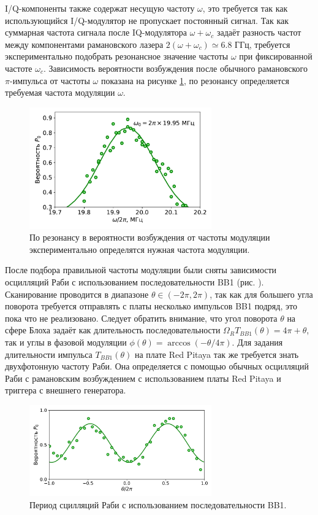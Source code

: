 I/Q-компоненты также содержат несущую частоту $\omega$, это требуется так как использующийся I/Q-модулятор не пропускает постоянный сигнал. Так как суммарная частота сигнала после IQ-модулятора $\omega + \omega_c$ задаёт разность частот между компонентами рамановского лазера $2(\omega + \omega_c) \simeq 6.8 \text{ ГГц}$, требуется экспериментально подобрать резонансное значение частоты $\omega$ при фиксированной частоте $\omega_c$. Зависимость вероятности возбуждения после обычного рамановского $\pi$-импульса от частоты $\omega$ показана на рисунке \ref{fig:omega_scan}, по резонансу определяется требуемая частота модуляции $\omega$. 

\begin{figure}[H]
	\centering
	\includegraphics[width=0.7\textwidth]{images/omega_scan.pdf}
	\caption{По резонансу в вероятности возбуждения от частоты модуляции экспериментально определятся нужная частота модуляции.}
	\label{fig:omega_scan}
\end{figure}

После подбора правильной частоты модуляции были сняты зависимости осцилляций Раби с использованием последовательности BB1 (рис. ). Сканирование проводится в диапазоне $\theta \in (-2\pi, 2\pi)$, так как для большего угла поворота требуется отправлять с платы несколько импульсов BB1 подряд, это пока что не реализовано. Следует обратить внимание, что угол поворота $\theta$ на сфере Блоха задаёт как длительность последовательности $\Omega_R T_{BB1}(\theta) = 4\pi + \theta$, так и углы в фазовой модуляции $\phi(\theta) = \arccos(-\theta/4\pi)$. Для задания длительности импульса $T_{BB1}(\theta)$ на плате Red Pitaya так же требуется знать двухфотонную частоту Раби. Она определяется с помощью обычных осцилляций Раби с рамановским возбуждением с использованием платы Red Pitaya и триггера с внешнего генератора.

\begin{figure}[H]
	\centering
	\includegraphics[width=0.7\textwidth]{images/theta_scan.pdf}
	\caption{Период сцилляций Раби с использованием последовательности BB1.}
	\label{fig:theta_scan}
\end{figure}

